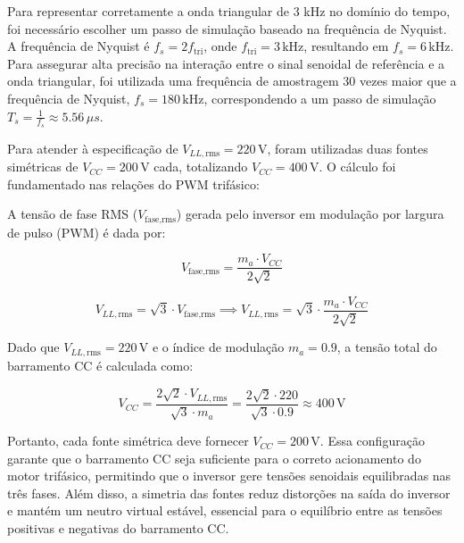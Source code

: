 \documentclass[a4paper, 11pt]{article}
\begin{document}
Para representar corretamente a onda triangular de 3 kHz no domínio do tempo, foi necessário escolher um passo de simulação baseado na frequência de Nyquist. A frequência de Nyquist é \(f_s = 2 f_\text{tri}\), onde \(f_\text{tri} = 3\,\mathrm{kHz}\), resultando em \(f_s = 6\,\mathrm{kHz}\). Para assegurar alta precisão na interação entre o sinal senoidal de referência e a onda triangular, foi utilizada uma frequência de amostragem 30 vezes maior que a frequência de Nyquist, \(f_s = 180\,\mathrm{kHz}\), correspondendo a um passo de simulação \(T_s = \frac{1}{f_s} \approx 5.56\,\mu s\).


Para atender à especificação de \( V_{LL, \text{rms}} = 220 \, \mathrm{V} \), foram utilizadas duas fontes simétricas de \( V_{CC} = 200 \, \mathrm{V} \) cada, totalizando \( V_{CC} = 400 \, \mathrm{V} \). O cálculo foi fundamentado nas relações do PWM trifásico:

A tensão de fase RMS (\( V_{\text{fase}, \text{rms}} \)) gerada pelo inversor em modulação por largura de pulso (PWM) é dada por:

\[
V_{\text{fase}, \text{rms}} = \frac{m_a \cdot V_{CC}}{2\sqrt{2}}
\]

\[
V_{LL, \text{rms}} = \sqrt{3} \cdot V_{\text{fase}, \text{rms}} \implies V_{LL, \text{rms}} = \sqrt{3} \cdot \frac{m_a \cdot V_{CC}}{2\sqrt{2}}
\]

Dado que \( V_{LL, \text{rms}} = 220 \, \mathrm{V} \) e o índice de modulação \( m_a = 0.9 \), a tensão total do barramento CC é calculada como:

\[
V_{CC} = \frac{2\sqrt{2} \cdot V_{LL, \text{rms}}}{\sqrt{3} \cdot m_a} = \frac{2\sqrt{2} \cdot 220}{\sqrt{3} \cdot 0.9} \approx 400 \, \mathrm{V}
\]

Portanto, cada fonte simétrica deve fornecer \( V_{CC} = 200 \, \mathrm{V} \). Essa configuração garante que o barramento CC seja suficiente para o correto acionamento do motor trifásico, permitindo que o inversor gere tensões senoidais equilibradas nas três fases. Além disso, a simetria das fontes reduz distorções na saída do inversor e mantém um neutro virtual estável, essencial para o equilíbrio entre as tensões positivas e negativas do barramento CC.
\end{document}
